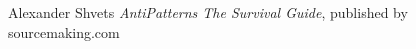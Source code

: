 \begin{thebibliography}{9}
     
    Alexander Shvets
    \emph{AntiPatterns The Survival Guide},
    published by sourcemaking.com

\end{thebibliography}